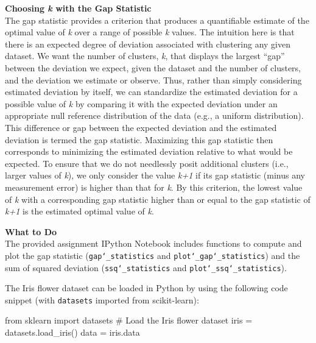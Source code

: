 \documentclass[paper=a4, fontsize=11pt]{scrartcl} %
\numberwithin{equation}{section} %
\numberwithin{figure}{section} %
\numberwithin{table}{section} %
\begin{document}
\vspace{8pt}

\textbf{Choosing \textit{k} with the Gap Statistic}\\
The gap statistic provides a criterion that produces a quantifiable estimate of the optimal value of \textit{k} over a range of possible \textit{k} values. The intuition here is that there is an expected degree of deviation associated with clustering any given dataset. We want the number of clusters, \textit{k}, that displays the largest ``gap'' between the deviation we expect, given the dataset and the number of clusters, and the deviation we estimate or observe. Thus, rather than simply considering estimated deviation by itself, we can standardize the estimated deviation for a possible value of \textit{k} by comparing it with the expected deviation under an appropriate null reference distribution of the data (e.g., a uniform distribution). This difference or gap between the expected deviation and the estimated deviation is termed the gap statistic. Maximizing this gap statistic then corresponds to minimizing the estimated deviation relative to what would be expected. To ensure that we do not needlessly posit additional clusters (i.e., larger values of \textit{k}), we only consider the value \textit{k+1} if its gap statistic (minus any measurement error) is higher than that for \textit{k}. By this criterion, the lowest value of \textit{k} with a corresponding gap statistic higher than or equal to the gap statistic of \textit{k+1} is the estimated optimal value of \textit{k}.

\vspace{8pt}

\textbf{What to Do}\\
The provided assignment IPython Notebook includes functions to compute and plot the gap statistic (\texttt{gap\char`_statistics} and \texttt{plot\char`_gap\char`_statistics}) and the sum of squared deviation (\texttt{ssq\char`_statistics} and \texttt{plot\char`_ssq\char`_statistics}).

\vspace{6pt}

The Iris flower dataset can be loaded in Python by using the following code snippet (with \texttt{datasets} imported from scikit-learn):

\vspace{6pt}

\begin{adjustbox}{minipage=0.8\textwidth,margin=0pt \smallskipamount,center}
\begin{python}
from sklearn import datasets
# Load the Iris flower dataset
iris = datasets.load_iris()
data = iris.data
\end{python}
\end{adjustbox}
\end{document}
